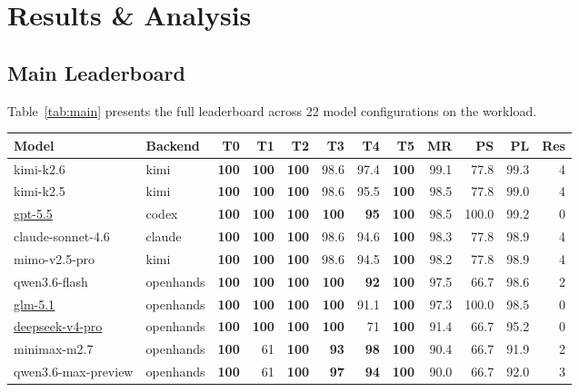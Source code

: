 \section{Results \& Analysis}

\subsection{Main Leaderboard}

Table~\ref{tab:main} presents the full \eva{} leaderboard across 22 model configurations on the \yatcc{} workload.

\begin{table}[!t]
\centering
\small
\begin{tabular}{llrrrrrrrrrr}
\toprule
\textbf{Model} & \textbf{Backend} & \textbf{T0} & \textbf{T1} & \textbf{T2} & \textbf{T3} & \textbf{T4} & \textbf{T5} & \textbf{MR} & \textbf{PS} & \textbf{PL} & \textbf{Res} \\
\midrule
kimi-k2.6 & kimi & \textbf{100} & \textbf{100} & \textbf{100} & 98.6 & 97.4 & \textbf{100} & 99.1 & 77.8 & 99.3 & 4 \\
kimi-k2.5 & kimi & \textbf{100} & \textbf{100} & \textbf{100} & 98.6 & 95.5 & \textbf{100} & 98.5 & 77.8 & 99.0 & 4 \\
\underline{gpt-5.5} & codex & \textbf{100} & \textbf{100} & \textbf{100} & \textbf{100} & \textbf{95} & \textbf{100} & 98.5 & 100.0 & 99.2 & 0 \\
claude-sonnet-4.6 & claude & \textbf{100} & \textbf{100} & \textbf{100} & 98.6 & 94.6 & \textbf{100} & 98.3 & 77.8 & 98.9 & 4 \\
mimo-v2.5-pro & kimi & \textbf{100} & \textbf{100} & \textbf{100} & 98.6 & 94.5 & \textbf{100} & 98.2 & 77.8 & 98.9 & 4 \\
qwen3.6-flash & openhands & \textbf{100} & \textbf{100} & \textbf{100} & \textbf{100} & \textbf{92} & \textbf{100} & 97.5 & 66.7 & 98.6 & 2 \\
\underline{glm-5.1} & openhands & \textbf{100} & \textbf{100} & \textbf{100} & \textbf{100} & 91.1 & \textbf{100} & 97.3 & 100.0 & 98.5 & 0 \\
\underline{deepseek-v4-pro} & openhands & \textbf{100} & \textbf{100} & \textbf{100} & \textbf{100} & 71 & \textbf{100} & 91.4 & 66.7 & 95.2 & 0 \\
minimax-m2.7 & openhands & \textbf{100} & 61 & \textbf{100} & \textbf{93} & \textbf{98} & \textbf{100} & 90.4 & 66.7 & 91.9 & 2 \\
qwen3.6-max-preview & openhands & \textbf{100} & 61 & \textbf{100} & \textbf{97} & \textbf{94} & \textbf{100} & 90.0 & 66.7 & 92.0 & 3 \\

\end{tabular}
\end{table}
